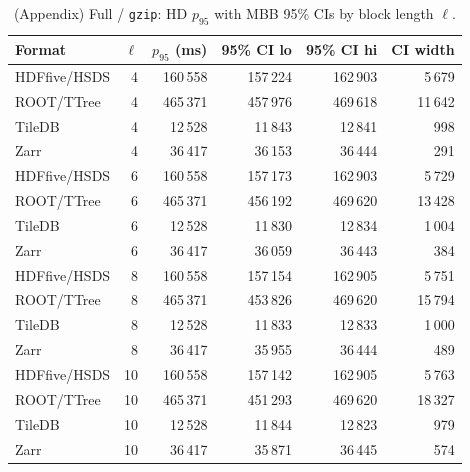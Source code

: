 \documentclass[nomenclature, english, bibtex]{kththesis}
\numberwithin{listing}{chapter}
\begin{document}
\begin{table}[H]
  \centering
  \caption*{(Appendix) Full / \texttt{gzip}: \gls{HD} $p_{95}$ with \gls{MBB} 95\% \glspl{CI} by block length $\ell$.}
  \begin{tabular}{l r r r r r}
    \toprule
    Format & $\ell$ & $p_{95}$ (ms) & 95\% \gls{CI} lo & 95\% \gls{CI} hi & \gls{CI} width \\
    \midrule
    \gls{HDFfive}/\gls{HSDS} & 4  & 160\,558 & 157\,224 & 162\,903 & 5\,679 \\
    \gls{ROOT}/\gls{TTree} & 4  & 465\,371 & 457\,976 & 469\,618 & 11\,642 \\
    TileDB & 4 & 12\,528  & 11\,843  & 12\,841  & 998 \\
    Zarr & 4  & 36\,417  & 36\,153  & 36\,444  & 291 \\
    \gls{HDFfive}/\gls{HSDS} & 6  & 160\,558 & 157\,173 & 162\,903 & 5\,729 \\
    \gls{ROOT}/\gls{TTree} & 6  & 465\,371 & 456\,192 & 469\,620 & 13\,428 \\
    TileDB & 6 & 12\,528  & 11\,830  & 12\,834  & 1\,004 \\
    Zarr & 6  & 36\,417  & 36\,059  & 36\,443  & 384 \\
    \gls{HDFfive}/\gls{HSDS} & 8  & 160\,558 & 157\,154 & 162\,905 & 5\,751 \\
    \gls{ROOT}/\gls{TTree} & 8  & 465\,371 & 453\,826 & 469\,620 & 15\,794 \\
    TileDB & 8 & 12\,528  & 11\,833  & 12\,833  & 1\,000 \\
    Zarr & 8  & 36\,417  & 35\,955  & 36\,444  & 489 \\
    \gls{HDFfive}/\gls{HSDS} & 10 & 160\,558 & 157\,142 & 162\,905 & 5\,763 \\
    \gls{ROOT}/\gls{TTree} & 10 & 465\,371 & 451\,293 & 469\,620 & 18\,327 \\
    TileDB & 10& 12\,528  & 11\,844  & 12\,823  & 979 \\
    Zarr & 10 & 36\,417  & 35\,871  & 36\,445  & 574 \\
    \bottomrule
  \end{tabular}
\end{table}
\end{document}
